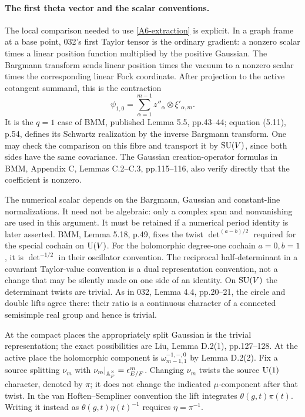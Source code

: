 \documentclass[11pt]{article}
\theoremstyle{definition}\newtheorem{definition}[theorem]{Definition}\newtheorem{remark}[theorem]{Remark}
\begin{document}
\paragraph{The first theta vector and the scalar conventions.}
The local comparison needed to use \eqref{A6-extraction} is explicit.
In a graph frame at a base point, 032's first Taylor tensor is the
ordinary gradient: a nonzero scalar times a linear position function
multiplied by the positive Gaussian. The Bargmann transform sends
linear position times the vacuum to a nonzero scalar times the
corresponding linear Fock coordinate. After projection to the active
cotangent summand, this is the contraction
\[
 \psi_{1,0}=\sum_{\alpha=1}^{m-1}
                 z''_\alpha\otimes\xi'_{\alpha,m}.
\]
It is the $q=1$ case of BMM, published Lemma 5.5, pp.43--44;
equation (5.11), p.54, defines its Schwartz realization by the
inverse Bargmann transform. One may check the comparison on this
fibre and transport it by $\operatorname{SU}(V)$, since both sides have the same
covariance. The Gaussian creation-operator formulas in BMM,
Appendix C, Lemmas C.2--C.3, pp.115--116, also verify directly that
the coefficient is nonzero.

The numerical scalar depends on the Bargmann, Gaussian and
constant-line normalizations. It need not be algebraic: only a
complex span and nonvanishing are used in this argument. It must be
retained if a numerical period identity is later asserted.
BMM, Lemma 5.18, p.49, fixes the twist
$\det^{(a-b)/2}$ required for the special cochain on $\operatorname{U}(V)$.
For the holomorphic degree-one cochain $a=0,b=1$, it is
$\det^{-1/2}$ in their oscillator convention. The reciprocal
half-determinant in a covariant Taylor-value convention is a dual
representation convention, not a change that may be silently made
on one side of an identity. On $\operatorname{SU}(V)$ the determinant twists
are trivial. As in 032, Lemma 4.4, pp.20--21, the circle and double
lifts agree there: their ratio is a continuous character of a
connected semisimple real group and hence is trivial.

At the compact places the appropriately split Gaussian is the
trivial representation; the exact possibilities are Liu,
Lemma D.2(1), pp.127--128. At the active place the holomorphic
component is $\omega_{m-1,1}^{-1,-,0}$ by Lemma D.2(2).
Fix a source splitting $\nu_m$ with
$\nu_m|_{\mathbb A_F^\times}=\epsilon_{E/F}^m$. Changing $\nu_m$
twists the source $\operatorname{U}(1)$ character, denoted by $\pi$; it does not
change the indicated $\mu$-component after that twist. In the
van Hoften--Sempliner convention the lift integrates
$\theta(g,t)\pi(t)$. Writing it instead as
$\theta(g,t)\eta(t)^{-1}$ requires $\eta=\pi^{-1}$.
\end{document}
